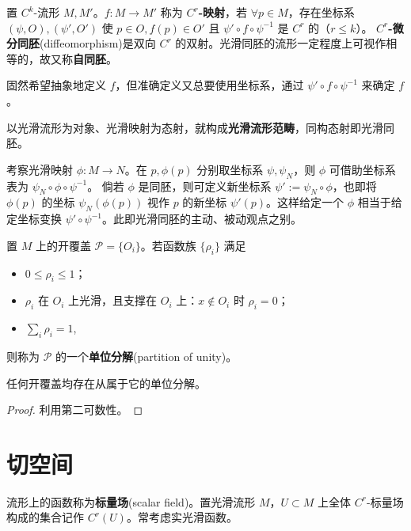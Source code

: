 \begin{definition}
    置 $C^k$-流形 $M,M'$。$f:M\to M'$ 称为 $C^r$\textbf{-映射}，若 $\forall p\in M$，存在坐标系 $(\psi,O),(\psi',O')$ 使 $p\in O,f(p)\in O'$ 且 $\psi'\circ f\circ \psi^{-1}$ 是 $C^r$ 的（$r\leqslant k$）。
    \textbf{$C^r$-微分同胚}(diffeomorphism)是双向 $C^r$ 的双射。光滑同胚的流形一定程度上可视作相等的，故又称\textbf{自同胚}。
\end{definition}
\begin{remark}
    固然希望抽象地定义 $f$，但准确定义又总要使用坐标系，通过 $\psi'\circ f\circ \psi^{-1}$ 来确定 $f$。
\end{remark}

以光滑流形为对象、光滑映射为态射，就构成\textbf{光滑流形范畴}，同构态射即光滑同胚。

考察光滑映射 $\phi:M\to N$。在 $p,\phi(p)$ 分别取坐标系 $\psi,\psi_N$，则 $\phi$ 可借助坐标系表为 $\psi_N \circ\phi\circ\psi^{-1}$。
倘若 $\phi$ 是同胚，则可定义新坐标系 $\psi':=\psi_N\circ\phi$，也即将 $\phi(p)$ 的坐标 $\psi_N(\phi(p))$ 视作 $p$ 的新坐标 $\psi'(p)$。这样给定一个 $\phi$ 相当于给定坐标变换 $\psi' \circ\psi^{-1}$。此即光滑同胚的主动、被动观点之别。

\begin{definition}
    置 $M$ 上的开覆盖 $\mathscr P=\{O_i\}$。若函数族 $\{\rho_i\}$ 满足
    \begin{itemize}
        \item $0\leqslant\rho_i\leqslant 1$；
        \item $\rho_i$ 在 $O_i$ 上光滑，且支撑在 $O_i$ 上：$x\notin O_i$ 时 $\rho_i=0$；
        \item $\sum_i \rho_i=1$,
    \end{itemize}
    则称为 $\mathscr P$ 的一个\textbf{单位分解}(partition of unity)。
\end{definition}
\begin{theorem}
    任何开覆盖均存在从属于它的单位分解。
\end{theorem}
\begin{proof}
    利用第二可数性。
\end{proof}

\section{切空间}

\begin{definition}
    流形上的函数称为\textbf{标量场}(scalar field)。置光滑流形 $M$，$U\subset M$ 上全体 $C^r$-标量场构成的集合记作 $C^r(U)$。常考虑实光滑函数。
\end{definition}

